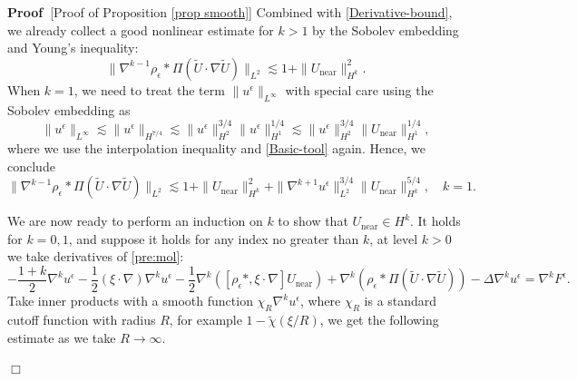\documentclass[11pt,a4paper]{article}
\numberwithin{equation}{section}
\newcommand{\cdummy}{\cdot}
\newcommand{\tmop}[1]{\ensuremath{\operatorname{#1}}}
\newenvironment{proof}{\noindent\textbf{Proof\ }}{\hspace*{\fill}$\Box$\medskip}
\begin{document}
\begin{proof}[Proof of Proposition \ref{prop smooth}]
Combined with \eqref{Derivative-bound}, we already collect a good nonlinear estimate for $k>1$ by the Sobolev embedding and Young's inequality:\begin{equation}
    \label{non est}
    \|\nabla^{k-1}\rho_\epsilon *\Pi (\widetilde{U} \cdot \nabla \widetilde{U})\|_{L^2}\lesssim1+\|U_{\tmop{near}}\|_{H^k}^2.
\end{equation}
When $k=1$, we need to treat the term $\|u^\epsilon\|_{L^\infty}$ with special care using the Sobolev embedding as \[\|u^\epsilon\|_{L^\infty}\lesssim\|u^\epsilon\|_{H^{7/4}}\lesssim\|u^\epsilon\|_{H^{2}}^{3/4}\|u^\epsilon\|_{H^{1}}^{1/4}\lesssim\|u^\epsilon\|_{H^{2}}^{3/4}\|U_{\tmop{near}}\|_{H^1}^{1/4}, \]
where we use the interpolation inequality and \eqref{Basic-tool} again.
Hence, we conclude\begin{equation}
    \label{non est0}
    \|\nabla^{k-1}\rho_\epsilon *\Pi (\widetilde{U} \cdot \nabla \widetilde{U})\|_{L^2}\lesssim1+\|U_{\tmop{near}}\|_{H^k}^2+\|\nabla^{k+1}u^\epsilon\|_{L^2}^{3/4}\|U_{\tmop{near}}\|_{H^k}^{5/4}, \quad k=1.
\end{equation}

We are now ready to perform an induction on $k$ to show that $U_{\tmop{near}}\in H^k$. It holds for $k=0,1$, and suppose it holds for any index no greater than $k$, at level $k>0$ we take derivatives of \eqref{pre:mol}:
  \begin{equation}
      - \frac{1+k}{2} \nabla^{k} u^\epsilon - \frac{1}{2} (\xi \cdummy\nabla)
       \nabla^{k} u^\epsilon -\frac{1}{2}\nabla^k([\rho_\epsilon *,\xi\cdot\nabla]U_{\tmop{near}})+ \nabla^{k}(\rho_\epsilon *\Pi (\widetilde{U} \cdot \nabla \widetilde{U})) - \Delta \nabla^{k}
       u^\epsilon = \nabla^{k} F^\epsilon. \label{uneareq}
  \end{equation}  
       Take inner products with a smooth function $\chi_R\nabla^{k} u^\epsilon$, where $\chi_R$ is a standard cutoff function with radius $R$, for example $1-\widetilde{\chi}(\xi/R)$, we get the following estimate as we take $R\to\infty$.


\end{proof}
\end{document}
